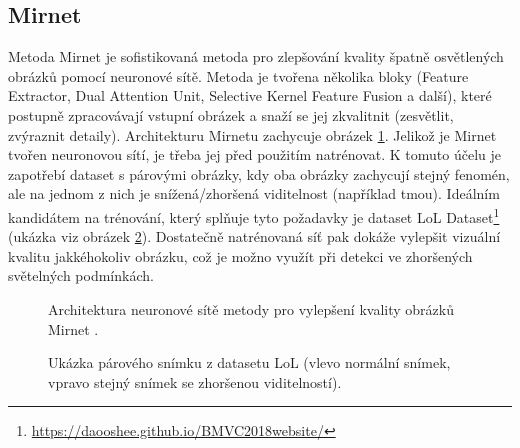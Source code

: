 \subsection*{Mirnet}
Metoda Mirnet\cite{mirnet} je sofistikovaná metoda pro zlepšování kvality špatně osvětlených obrázků pomocí neuronové sítě. Metoda je tvořena několika bloky (Feature Extractor, Dual Attention Unit, Selective Kernel Feature Fusion a další), které postupně zpracovávají vstupní obrázek a snaží se jej zkvalitnit (zesvětlit, zvýraznit detaily). Architekturu Mirnetu zachycuje obrázek \ref{obrazek:mirnet}. Jelikož je Mirnet tvořen neuronovou sítí, je třeba jej před použitím natrénovat. K tomuto účelu je zapotřebí dataset s párovými obrázky, kdy oba obrázky zachycují stejný fenomén, ale na jednom z nich je snížená/zhoršená viditelnost (například tmou). Ideálním kandidátem na trénování, který splňuje tyto požadavky je dataset LoL Dataset\footnote{\url{https://daooshee.github.io/BMVC2018website/}} (ukázka viz obrázek \ref{obrazek:loldataset}). Dostatečně natrénovaná síť pak dokáže vylepšit vizuální kvalitu jakkéhokoliv obrázku, což je možno využít při detekci ve zhoršených světelných podmínkách.

\begin{figure}[H]
  \begin{center}
  \label{obrazek:mirnet}
  \caption{Architektura neuronové sítě metody pro vylepšení kvality obrázků Mirnet \cite{mirnet}.}
  \end{center}
\end{figure}


\begin{figure}[H]
  \begin{center}
  \label{obrazek:loldataset}
  \caption{Ukázka párového snímku z datasetu LoL (vlevo normální snímek, vpravo stejný snímek se zhoršenou viditelností).}
  \end{center}
\end{figure}
 
